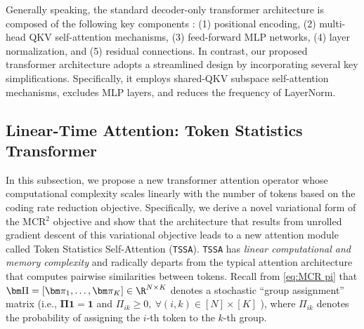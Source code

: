 \documentclass[../../book-main.tex]{subfiles}
\begin{document}
Generally speaking, the standard decoder-only transformer architecture is composed of the following key components \cite{vaswani2017attention}: (1)  positional encoding, (2) multi-head QKV self-attention mechanisms, (3) feed-forward MLP networks, (4) layer normalization, and (5) residual connections. In contrast, our proposed transformer architecture adopts a streamlined design by incorporating several key simplifications. Specifically, it employs shared-QKV subspace self-attention mechanisms, excludes MLP layers, and reduces the frequency of LayerNorm.










\subsection{Linear-Time Attention: Token Statistics Transformer}\label{sub:tost} 

In this subsection, we propose a new transformer attention operator whose computational complexity scales linearly with the number of tokens based on the coding rate reduction objective.  Specifically, we derive a novel variational form of the MCR$^2$ objective and show that the architecture that results from unrolled gradient descent of this variational objective leads to a new attention module called Token Statistics Self-Attention (\texttt{TSSA}). \texttt{TSSA} has {\em linear computational and memory complexity} and radically departs from the typical attention architecture that computes pairwise similarities between tokens.  Recall from \eqref{eq:MCR pi} that $\bm \Pi = [\bm \pi_1, \ldots, \bm \pi_K] \in \R^{N \times K}$ denotes a stochastic ``group assignment'' matrix (i.e., $\bm \Pi \bm 1 = \bm 1$ and $\Pi_{ik} \geq 0, \  \forall (i,k) \in [N] \times [K]$ ), where $\Pi_{ik}$ denotes the probability of assigning the $i$-th token to the $k$-th group. 

 
\end{document}
